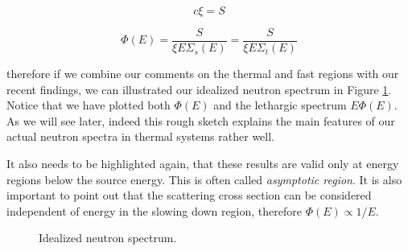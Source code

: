 $$c\xi=S$$

$$\Phi(E)=\frac{S}{\xi E\Sigma_s(E)}=\frac{S}{\xi E\Sigma_t(E)}$$

\noindent therefore if we combine our comments on the thermal and fast regions with our recent findings, we can illustrated our idealized neutron spectrum in Figure \ref{fig:idealneutronspectrum}. Notice that we have plotted both $\Phi(E)$ and the lethargic spectrum $E\Phi(E)$. As we will see later, indeed this rough sketch explains the main features of our actual neutron spectra in thermal systems rather well.

It also needs to be highlighted again, that these results are valid only at energy regions below the source energy. This is often called \textit{asymptotic region}. It is also important to point out that the scattering cross section can be considered independent of energy in the slowing down region, therefore $\Phi(E)\propto 1/E$.

\begin{figure}[ht!]
\protect {}\protect
\caption{\label{fig:idealneutronspectrum} \footnotesize{Idealized neutron spectrum.}}
\end{figure}

